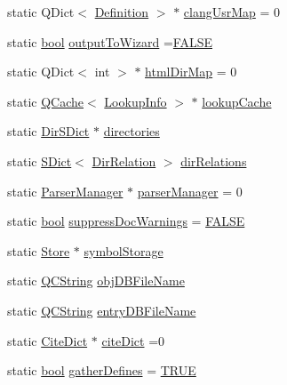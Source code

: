 \begin{DoxyCompactItemize}
static Q\+Dict$<$ \hyperlink{class_definition}{Definition} $>$ $\ast$ \hyperlink{class_doxygen_af917c09272753710958b7a4b6ca93bb4}{clang\+Usr\+Map} = 0
\item 
static \hyperlink{qglobal_8h_a1062901a7428fdd9c7f180f5e01ea056}{bool} \hyperlink{class_doxygen_a99390d84b1dbddb5e101db17058e7323}{output\+To\+Wizard} =\hyperlink{qglobal_8h_a10e004b6916e78ff4ea8379be80b80cc}{F\+A\+L\+S\+E}
\item 
static Q\+Dict$<$ int $>$ $\ast$ \hyperlink{class_doxygen_a4ebc263d76c534ae442d9086a986ed0c}{html\+Dir\+Map} = 0
\item 
static \hyperlink{class_q_cache}{Q\+Cache}$<$ \hyperlink{struct_lookup_info}{Lookup\+Info} $>$ $\ast$ \hyperlink{class_doxygen_a68ae110f5af9b5ceff4a5c9d1cca1607}{lookup\+Cache}
\item 
static \hyperlink{class_dir_s_dict}{Dir\+S\+Dict} $\ast$ \hyperlink{class_doxygen_a7348a6369c6a86bded4abb5154e654cf}{directories}
\item 
static \hyperlink{class_s_dict}{S\+Dict}$<$ \hyperlink{class_dir_relation}{Dir\+Relation} $>$ \hyperlink{class_doxygen_adcaa04f254445beb29623884c29976d7}{dir\+Relations}
\item 
static \hyperlink{class_parser_manager}{Parser\+Manager} $\ast$ \hyperlink{class_doxygen_a3882f6ce51621c77d409060e46cae378}{parser\+Manager} = 0
\item 
static \hyperlink{qglobal_8h_a1062901a7428fdd9c7f180f5e01ea056}{bool} \hyperlink{class_doxygen_a0f0f967e0b97a2292ba58f22b8a1e817}{suppress\+Doc\+Warnings} = \hyperlink{qglobal_8h_a10e004b6916e78ff4ea8379be80b80cc}{F\+A\+L\+S\+E}
\item 
static \hyperlink{class_store}{Store} $\ast$ \hyperlink{class_doxygen_ad63a00fa6d4a5378ab8cd988e0b6df16}{symbol\+Storage}
\item 
static \hyperlink{class_q_c_string}{Q\+C\+String} \hyperlink{class_doxygen_aa42afb3dcce1fa7ed8fbae8537da4710}{obj\+D\+B\+File\+Name}
\item 
static \hyperlink{class_q_c_string}{Q\+C\+String} \hyperlink{class_doxygen_a29ccd68397b81e581a060397f0c2a220}{entry\+D\+B\+File\+Name}
\item 
static \hyperlink{class_cite_dict}{Cite\+Dict} $\ast$ \hyperlink{class_doxygen_acd0346761dcfd739ea0722d6451d436b}{cite\+Dict} =0
\item 
static \hyperlink{qglobal_8h_a1062901a7428fdd9c7f180f5e01ea056}{bool} \hyperlink{class_doxygen_a8963844c275524bcf2b1fb184bfe786d}{gather\+Defines} = \hyperlink{qglobal_8h_a04a6422a52070f0dc478693da640242b}{T\+R\+U\+E}

\end{DoxyCompactItemize}
